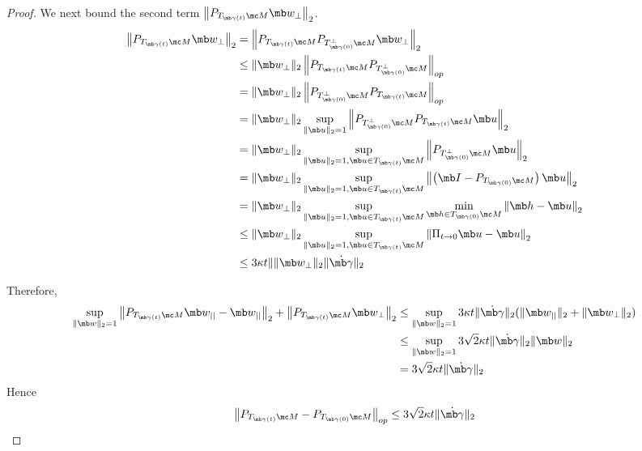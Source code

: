 \begin{proof}
We next bound the second term $\left\| P_{T_{\mb\gamma(t)} \mc M} \mb w_{\perp}  \right\|_2$.
\begin{equation}
    \begin{aligned}
        \left\| P_{T_{\mb\gamma(t)} \mc M} \mb w_{\perp}  \right\|_2
        &= \left\| P_{T_{\mb\gamma(t)} \mc M} P_{T_{\mb\gamma(0)}^{\perp}\mc M}\mb w_{\perp}  \right\|_2\\
        &\leq \|\mb w_{\perp}\|_2 \left\| P_{T_{\mb\gamma(t)} \mc M} P_{T_{\mb\gamma(0)}^{\perp}\mc M}\right\|_{op}\\
        &= \|\mb w_{\perp}\|_2 \left\| P_{T_{\mb\gamma(0)}^{\perp} \mc M} P_{T_{\mb\gamma(t)}\mc M}\right\|_{op} \\
        &= \|\mb w_{\perp}\|_2 \sup_{\|\mb u\|_2=1} \left\| P_{T_{\mb\gamma(0)}^{\perp} \mc M} P_{T_{\mb\gamma(t)}\mc M} \mb u\right\|_2\\
        &= \|\mb w_{\perp}\|_2 \sup_{\|\mb u\|_2=1, \mb u \in T_{\mb\gamma(t)}\mc M} \left\| P_{T_{\mb\gamma(0)}^{\perp} \mc M} \mb u\right\|_2\\
        &= \|\mb w_{\perp}\|_2 \sup_{\|\mb u\|_2=1, \mb u \in T_{\mb\gamma(t)}\mc M} \left\| \left(\mb I - P_{T_{\mb\gamma(0)} \mc M} \right) \mb u\right\|_2\\
        &= \|\mb w_{\perp}\|_2 \sup_{\|\mb u\|_2=1, \mb u \in T_{\mb\gamma(t)}\mc M} \min_{\mb h \in T_{\mb\gamma(0)}\mc M}\left\| \mb h - \mb u\right\|_2\\
        &\leq \|\mb w_{\perp}\|_2 \sup_{\|\mb u\|_2=1, \mb u \in T_{\mb\gamma(t)}\mc M} \left\|
        \Pi_{t\rightarrow 0} \mb u - \mb u\right\|_2\\
        &\leq 3 \kappa t \| \|\mb w_{\perp}\|_2 \|\Dot{\mb\gamma}\|_2 
    \end{aligned}
\end{equation}

Therefore,
\begin{equation}
    \begin{aligned}
        \sup_{\|\mb w\|_2=1} \left\| P_{T_{\mb\gamma(t)} \mc M} \mb w_{||} -  \mb w_{||} \right\|_2 
        + \left\| P_{T_{\mb\gamma(t)} \mc M} \mb w_{\perp}  \right\|_2
        &\leq \sup_{\|\mb w\|_2=1} 3 \kappa t\|\Dot{\mb\gamma}\|_2  (\|\mb w_{||}\|_2 + \|\mb w_{\perp}\|_2)\\
        &\leq \sup_{\|\mb w\|_2=1} 3 \sqrt{2} \kappa t \|\Dot{\mb\gamma}\|_2 \|\mb w\|_2\\
        &= 3\sqrt{2} \kappa t \|\Dot{\mb\gamma}\|_2 
    \end{aligned}
\end{equation}
Hence
\begin{equation}
    \left\| P_{T_{\mb\gamma(t)} \mc M} - P_{T_{\mb\gamma(0)} \mc M}\right\|_{op}
    \leq 3\sqrt{2} \kappa t \|\Dot{\mb\gamma}\|_2  
\end{equation}

\end{proof}


